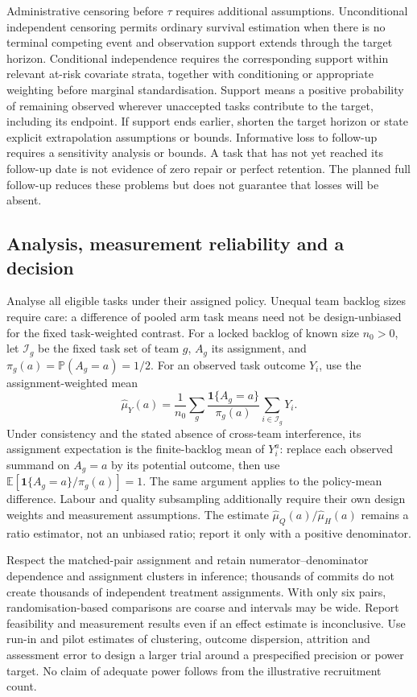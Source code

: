 \documentclass[11pt,a4paper]{amsart}
\theoremstyle{definition}
\theoremstyle{remark}
\newcommand{\E}{\mathbb E}
\newcommand{\Prb}{\mathbb P}
\newcommand{\ind}{\mathbf 1}
\begin{document}
Administrative censoring before $\tau$ requires additional assumptions. Unconditional independent censoring permits ordinary survival estimation when there is no terminal competing event and observation support extends through the target horizon. Conditional independence requires the corresponding support within relevant at-risk covariate strata, together with conditioning or appropriate weighting before marginal standardisation. Support means a positive probability of remaining observed wherever unaccepted tasks contribute to the target, including its endpoint. If support ends earlier, shorten the target horizon or state explicit extrapolation assumptions or bounds. Informative loss to follow-up requires a sensitivity analysis or bounds. A task that has not yet reached its follow-up date is not evidence of zero repair or perfect retention. The planned full follow-up reduces these problems but does not guarantee that losses will be absent.

\subsection{Analysis, measurement reliability and a decision}

Analyse all eligible tasks under their assigned policy. Unequal team backlog sizes require care: a difference of pooled arm task means need not be design-unbiased for the fixed task-weighted contrast. For a locked backlog of known size $n_0>0$, let $\mathcal I_g$ be the fixed task set of team $g$, $A_g$ its assignment, and $\pi_g(a)=\Prb(A_g=a)=1/2$. For an observed task outcome $Y_i$, use the assignment-weighted mean
\begin{equation}
\label{eq:cluster-ht}
 \widehat\mu_Y(a)=\frac{1}{n_0}\sum_g
 \frac{\ind\{A_g=a\}}{\pi_g(a)}\sum_{i\in\mathcal I_g}Y_i.
\end{equation}
Under consistency and the stated absence of cross-team interference, its assignment expectation is the finite-backlog mean of $Y_i^a$: replace each observed summand on $A_g=a$ by its potential outcome, then use $\E[\ind\{A_g=a\}/\pi_g(a)]=1$. The same argument applies to the policy-mean difference. Labour and quality subsampling additionally require their own design weights and measurement assumptions. The estimate $\widehat\mu_Q(a)/\widehat\mu_H(a)$ remains a ratio estimator, not an unbiased ratio; report it only with a positive denominator.

Respect the matched-pair assignment and retain numerator--denominator dependence and assignment clusters in inference; thousands of commits do not create thousands of independent treatment assignments. With only six pairs, randomisation-based comparisons are coarse and intervals may be wide. Report feasibility and measurement results even if an effect estimate is inconclusive. Use run-in and pilot estimates of clustering, outcome dispersion, attrition and assessment error to design a larger trial around a prespecified precision or power target. No claim of adequate power follows from the illustrative recruitment count.
\end{document}
